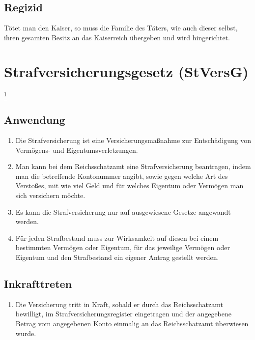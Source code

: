 \documentclass{article}
\begin{document}
\subsection{Regizid}
Tötet man den Kaiser, so muss die Familie des Täters, wie auch dieser selbst, ihren gesamten Besitz an das Kaiserreich übergeben und wird hingerichtet.

\section{Strafversicherungsgesetz (StVersG)}\footnote{Reichsstrafversicherungsbeschluss vom 05. August 1920}
\localtableofcontents

\subsection{Anwendung}
\begin{enumerate}[(1)]
    \item Die Strafversicherung ist eine Versicherungsmaßnahme zur Entschädigung von Vermögens- und Eigentumsverletzungen.
    \item Man kann bei dem Reichsschatzamt eine Strafversicherung beantragen, indem man die betreffende Kontonummer angibt, sowie gegen welche Art des Verstoßes, mit wie viel Geld und für welches Eigentum oder Vermögen man sich versichern möchte.
    \item Es kann die Strafversicherung nur auf ausgewiesene Gesetze angewandt werden.
    \item Für jeden Strafbestand muss zur Wirksamkeit auf diesen bei einem bestimmten Vermögen oder Eigentum, für das jeweilige Vermögen oder Eigentum und den Strafbestand ein eigener Antrag gestellt werden.
\end{enumerate}

\subsection{Inkrafttreten}
\begin{enumerate}[(1)]
    \item Die Versicherung tritt in Kraft, sobald er durch das Reichsschatzamt bewilligt, im Strafversicherungsregister eingetragen und der angegebene Betrag vom angegebenen Konto einmalig an das Reichsschatzamt überwiesen wurde.
    \item Sie kann nur durch den Eigentümer des geschützten Vermögens oder Eigentums oder einen, durch diesen durch ein Rechtsgeschäft gemäß § 1 HGB bevollmächtigte Person oder Entität angemeldet und abgemeldet werden.
    \item Im Falle einer Abmeldung hat man keinen Anspruch auf die Rückerstattung der Einzahlung, sofern man die Rückerstattung nicht innerhalb von zwei Wochen nach Antragstellung beantragt und die Versicherung in dieser Zeit nicht zur Anwendung gekommen ist.
\end{enumerate}
\end{document}
